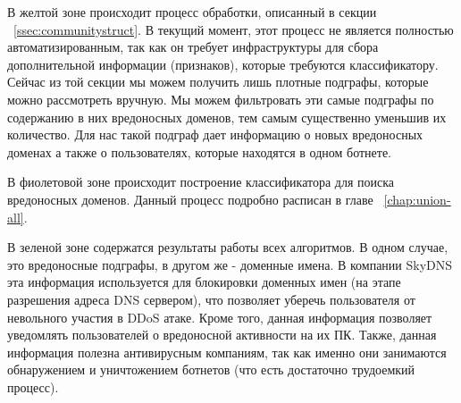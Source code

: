 \documentclass[14pt]{extreport} %
\begin{document}
В желтой зоне происходит процесс обработки, описанный в секции ~\ref{ssec:communitystruct}. В текущий момент, этот процесс не является полностью автоматизированным, так как он требует инфраструктуры для сбора дополнительной информации (признаков), которые требуются классификатору. Сейчас из той секции мы можем получить лишь плотные подграфы, которые можно рассмотреть вручную. Мы можем фильтровать эти самые подграфы по содержанию в них вредоносных доменов, тем самым существенно уменьшив их количество. Для нас такой подграф дает информацию о новых вредоносных доменах а также о пользователях, которые находятся в одном ботнете. 

В фиолетовой зоне происходит построение классификатора для поиска вредоносных доменов. Данный процесс подробно расписан в главе ~\ref{chap:union-all}.

В зеленой зоне содержатся результаты работы всех алгоритмов. В одном случае, это вредоносные подграфы, в другом же - доменные имена. В компании SkyDNS эта информация используется для блокировки доменных имен (на этапе разрешения адреса DNS сервером), что позволяет уберечь пользователя от невольного участия в DDoS атаке. Кроме того, данная информация позволяет уведомлять пользователей о вредоносной активности на их ПК. Также, данная информация полезна антивирусным компаниям, так как именно они занимаются обнаружением и уничтожением ботнетов (что есть достаточно трудоемкий процесс).
\end{document}
